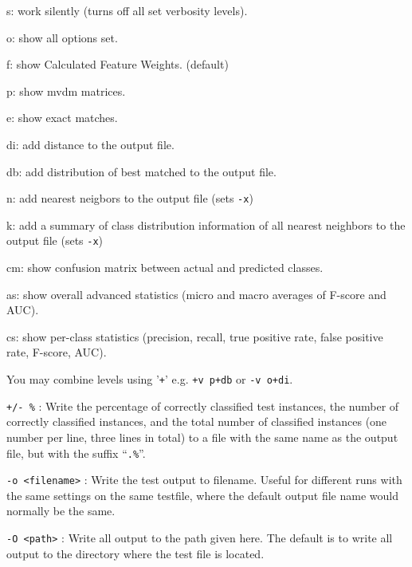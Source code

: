 \documentclass{report}
\begin{document}
\begin{description}
	\begin{description}
         \item s:  work silently (turns off all set verbosity levels).
         \item o:  show all options set.
         \item f:  show Calculated Feature Weights. (default)
         \item p:  show {\sc mvdm} matrices.
         \item e:  show exact matches.
         \item di: add distance to the output file.
         \item db: add distribution of best matched to the output file.
         \item n:  add nearest neigbors to the output file (sets {\tt -x})
	 \item k:  add a summary of class distribution information of all nearest neighbors to the output file (sets {\tt -x})
	 \item cm: show confusion matrix between actual and predicted classes.
         \item as: show overall advanced statistics (micro and macro averages of F-score and AUC).
         \item cs: show per-class statistics (precision, recall, true positive rate, false positive rate, F-score, AUC).
	\item You may combine levels using '{\tt +}' e.g. {\tt +v
         p+db} or {\tt -v o+di}.
	\end{description}

\item {\tt +/- \%} : Write the percentage of correctly classified test
  instances, the number of correctly classified instances, and the
  total number of classified instances (one number per line, three
  lines in total) to a file with the same name as the output file, but
  with the suffix ``{\tt .\%}''.

\item {\tt -o <filename>} : Write the test output to filename. Useful
  for different runs with the same settings on the same testfile,
  where the default output file name would normally be the same.

\item {\tt -O <path>} : Write all output to the path given here. The
  default is to write all output to the directory where the test file
  is located.

\end{description}
\end{document}
